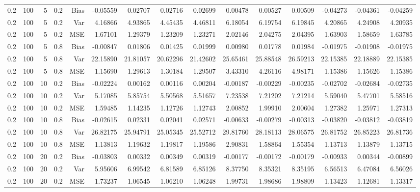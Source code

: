 \begin{table}[!htbp]
\begin{tabular}{lrrrrrrrrrrrrrr}
0.2 & 100 &  5 & 0.2 & Bias & -0.05559 & 0.02707 & 0.02716 & 0.02699 & 0.00478 & 0.00527 & 0.00509 & -0.04273 & -0.04361 & -0.04259 \\
0.2 & 100 &  5 & 0.2 & Var & 4.16866 & 4.93865 & 4.45435 & 4.46811 & 6.18054 & 6.19754 & 6.19845 & 4.20865 & 4.24908 & 4.20935 \\
0.2 & 100 &  5 & 0.2 & MSE & 1.67101 & 1.29379 & 1.23209 & 1.23271 & 2.02146 & 2.04275 & 2.04395 & 1.63903 & 1.58659 & 1.63785 \\
0.2 & 100 &  5 & 0.8 & Bias & -0.00847 & 0.01806 & 0.01425 & 0.01999 & 0.00980 & 0.01778 & 0.01984 & -0.01975 & -0.01908 & -0.01975 \\
0.2 & 100 &  5 & 0.8 & Var & 22.15890 & 21.81057 & 20.62296 & 21.42602 & 25.65461 & 25.88548 & 26.59213 & 22.15385 & 22.18889 & 22.15385 \\
0.2 & 100 &  5 & 0.8 & MSE & 1.15690 & 1.29613 & 1.30184 & 1.29507 & 3.43310 & 4.26116 & 4.98171 & 1.15386 & 1.15626 & 1.15386 \\
0.2 & 100 & 10 & 0.2 & Bias & -0.02224 & 0.00162 & 0.00116 & 0.00204 & -0.00187 & -0.00229 & -0.00235 & -0.02702 & -0.02684 & -0.02735 \\
0.2 & 100 & 10 & 0.2 & Var & 5.17085 & 5.85754 & 5.50568 & 5.51657 & 7.23538 & 7.21202 & 7.21214 & 5.59040 & 5.47701 & 5.58516 \\
0.2 & 100 & 10 & 0.2 & MSE & 1.59485 & 1.14235 & 1.12726 & 1.12743 & 2.00852 & 1.99910 & 2.00604 & 1.27382 & 1.25971 & 1.27313 \\
0.2 & 100 & 10 & 0.8 & Bias & -0.02615 & 0.02331 & 0.02041 & 0.02571 & -0.00633 & -0.00279 & -0.00313 & -0.03820 & -0.03812 & -0.03819 \\
0.2 & 100 & 10 & 0.8 & Var & 26.82175 & 25.94791 & 25.05345 & 25.52712 & 29.81760 & 28.18113 & 28.06575 & 26.81752 & 26.85223 & 26.81736 \\
0.2 & 100 & 10 & 0.8 & MSE & 1.13813 & 1.19632 & 1.19817 & 1.19586 & 2.90831 & 1.58864 & 1.55354 & 1.13713 & 1.13879 & 1.13715 \\
0.2 & 100 & 20 & 0.2 & Bias & -0.03803 & 0.00332 & 0.00349 & 0.00319 & -0.00177 & -0.00172 & -0.00179 & -0.00933 & 0.00344 & -0.00899 \\
0.2 & 100 & 20 & 0.2 & Var & 5.95606 & 6.99542 & 6.81589 & 6.85126 & 8.37750 & 8.35321 & 8.35195 & 6.56513 & 6.47084 & 6.56026 \\
0.2 & 100 & 20 & 0.2 & MSE & 1.73237 & 1.06545 & 1.06210 & 1.06248 & 1.99731 & 1.98686 & 1.98809 & 1.13423 & 1.12681 & 1.13317 \\

\end{tabular}
\end{table}
